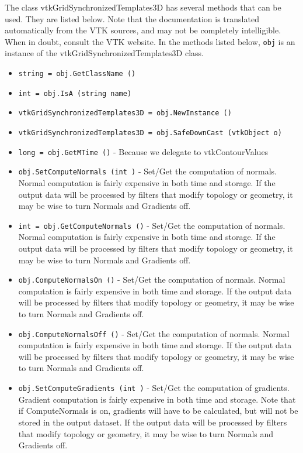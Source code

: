The class vtkGridSynchronizedTemplates3D has several methods that can be used.
  They are listed below.
Note that the documentation is translated automatically from the VTK sources,
and may not be completely intelligible.  When in doubt, consult the VTK website.
In the methods listed below, \verb|obj| is an instance of the vtkGridSynchronizedTemplates3D class.
\begin{itemize}
\item  \verb|string = obj.GetClassName ()|

\item  \verb|int = obj.IsA (string name)|

\item  \verb|vtkGridSynchronizedTemplates3D = obj.NewInstance ()|

\item  \verb|vtkGridSynchronizedTemplates3D = obj.SafeDownCast (vtkObject o)|

\item  \verb|long = obj.GetMTime ()| -  Because we delegate to vtkContourValues

\item  \verb|obj.SetComputeNormals (int )| -  Set/Get the computation of normals. Normal computation is fairly
 expensive in both time and storage. If the output data will be
 processed by filters that modify topology or geometry, it may be
 wise to turn Normals and Gradients off.

\item  \verb|int = obj.GetComputeNormals ()| -  Set/Get the computation of normals. Normal computation is fairly
 expensive in both time and storage. If the output data will be
 processed by filters that modify topology or geometry, it may be
 wise to turn Normals and Gradients off.

\item  \verb|obj.ComputeNormalsOn ()| -  Set/Get the computation of normals. Normal computation is fairly
 expensive in both time and storage. If the output data will be
 processed by filters that modify topology or geometry, it may be
 wise to turn Normals and Gradients off.

\item  \verb|obj.ComputeNormalsOff ()| -  Set/Get the computation of normals. Normal computation is fairly
 expensive in both time and storage. If the output data will be
 processed by filters that modify topology or geometry, it may be
 wise to turn Normals and Gradients off.

\item  \verb|obj.SetComputeGradients (int )| -  Set/Get the computation of gradients. Gradient computation is
 fairly expensive in both time and storage. Note that if
 ComputeNormals is on, gradients will have to be calculated, but
 will not be stored in the output dataset.  If the output data
 will be processed by filters that modify topology or geometry, it
 may be wise to turn Normals and Gradients off.


\end{itemize}
